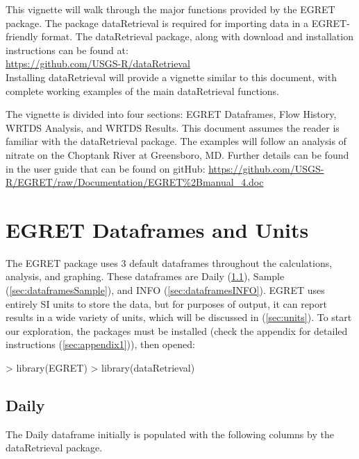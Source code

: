 \documentclass[a4paper,11pt]{article}
\begin{document}
This vignette will walk through the major functions provided by the EGRET package. The package dataRetrieval is required for importing data in a EGRET-friendly format. The dataRetrieval package, along with download and installation instructions can be found at:
\\
\url{https://github.com/USGS-R/dataRetrieval}
\\
Installing dataRetrieval will provide a vignette similar to this document, with complete working examples of the main dataRetrieval functions.

The vignette is divided into four sections: EGRET Dataframes, Flow History, WRTDS Analysis, and WRTDS Results. This document assumes the reader is familiar with the dataRetrieval package. The examples will follow an analysis of nitrate on the Choptank River at Greensboro, MD. Further details can be found in the user guide that can be found on gitHub: \url{https://github.com/USGS-R/EGRET/raw/Documentation/EGRET%2Bmanual_4.doc}


\section{EGRET Dataframes and Units}
\label{sec:dataframes}
The EGRET package uses 3 default dataframes throughout the calculations, analysis, and graphing. These dataframes are Daily (\ref{sec:dataframesDaily}), Sample (\ref{sec:dataframesSample}), and INFO (\ref{sec:dataframesINFO}). EGRET uses entirely SI units to store the data, but for purposes of output, it can report results in a wide variety of units, which will be discussed in (\ref{sec:units}). To start our exploration, the packages must be installed (check the appendix for detailed instructions (\ref{sec:appendix1})), then opened:
\begin{Schunk}
\begin{Sinput}
> library(EGRET)
> library(dataRetrieval)
\end{Sinput}
\end{Schunk}

\subsection{Daily}
\label{sec:dataframesDaily}
The Daily dataframe initially is populated with the following columns by the dataRetrieval package.
\end{document}
